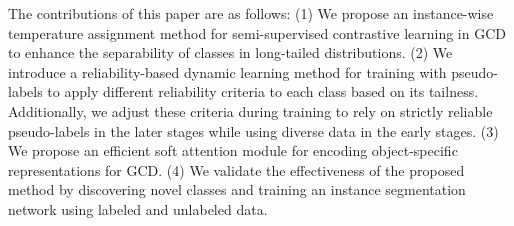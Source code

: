 
The contributions of this paper are as follows: (1) We propose an instance-wise temperature assignment method for semi-supervised contrastive learning in GCD to enhance the separability of classes in long-tailed distributions. (2) We introduce a reliability-based dynamic learning method for training with pseudo-labels to apply different reliability criteria to each class based on its tailness. Additionally, we adjust these criteria during training to rely on strictly reliable pseudo-labels in the later stages while using diverse data in the early stages. (3) We propose an efficient soft attention module for encoding object-specific representations for GCD. (4) We validate the effectiveness of the proposed method by discovering novel classes and training an instance segmentation network using labeled and unlabeled data.



% 

